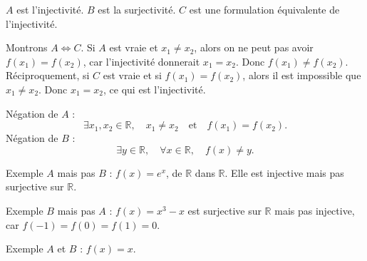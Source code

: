 \documentclass[11pt,a4paper]{article}
\newcommand{\R}{\mathbb{R}}
\newcommand{\ssi}{\Longleftrightarrow}
\begin{document}
\begin{correctionbox}[ORAUX 50]
\(A\) est l'injectivité. \(B\) est la surjectivité. \(C\) est une formulation équivalente de l'injectivité.

Montrons \(A\ssi C\). Si \(A\) est vraie et \(x_1\neq x_2\), alors on ne peut pas avoir \(f(x_1)=f(x_2)\), car l'injectivité donnerait \(x_1=x_2\). Donc \(f(x_1)\neq f(x_2)\). Réciproquement, si \(C\) est vraie et si \(f(x_1)=f(x_2)\), alors il est impossible que \(x_1\neq x_2\). Donc \(x_1=x_2\), ce qui est l'injectivité.

Négation de \(A\) :
\[
\exists x_1,x_2\in\R,\quad x_1\neq x_2\quad\text{et}\quad f(x_1)=f(x_2).
\]
Négation de \(B\) :
\[
\exists y\in\R,\quad \forall x\in\R,\quad f(x)\neq y.
\]

Exemple \(A\) mais pas \(B\) : \(f(x)=e^x\), de \(\R\) dans \(\R\). Elle est injective mais pas surjective sur \(\R\).

Exemple \(B\) mais pas \(A\) : \(f(x)=x^3-x\) est surjective sur \(\R\) mais pas injective, car \(f(-1)=f(0)=f(1)=0\).

Exemple \(A\) et \(B\) : \(f(x)=x\).
\end{correctionbox}
\end{document}
